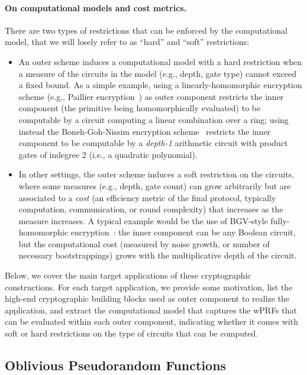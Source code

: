 \paragraph{On computational models and cost metrics.} There are two types of restrictions that can be enforced by the computational model, that we will losely refer to as ``hard'' and ``soft'' restrictions:
\begin{itemize}
	\item An outer scheme induces a computational model with a hard restriction when a measure of the circuits in the model (e.g., depth, gate type) cannot exceed a fixed bound. As a simple example, using a linearly-homomorphic encryption scheme (e.g., Paillier encryption~\cite{EC:Paillier99}) as outer component restricts the inner component (the primitive being homomorphically evaluated) to be computable by a circuit computing a linear combination over a ring; using instead the Boneh-Goh-Nissim encryption scheme~\cite{TCC:BonGohNis05} restricts the inner component to be computable by a \emph{depth-1} arithmetic circuit with product gates of indegree 2 (i.e., a quadratic polynomial).
	\item In other settings, the outer scheme induces a soft restriction on the circuits, where some measures (e.g., depth, gate count) can grow arbitrarily but are associated to a \emph{cost} (an efficiency metric of the final protocol, typically computation, communication, or round complexity) that increases as the measure increases. A typical example would be the use of BGV-style fully-homomorphic encryption~\cite{STOC:Gentry09,ITCS:BraGenVai12}: the inner component can be any Boolean circuit, but the computational cost (measured by noise growth, or number of necessary bootstrappings) grows with the multiplicative depth of the circuit.
\end{itemize}
Below, we cover the main target applications of these cryptographic constructions. For each target application, we provide some motivation, list the high-end cryptographic building blocks used as outer component to realize the application, and extract the computational model that captures the wPRFs that can be evaluated within each outer component, indicating whether it comes with soft or hard restrictions on the type of circuits that can be computed.

\subsection{Oblivious Pseudorandom Functions}
\label{subsec:oprf}

